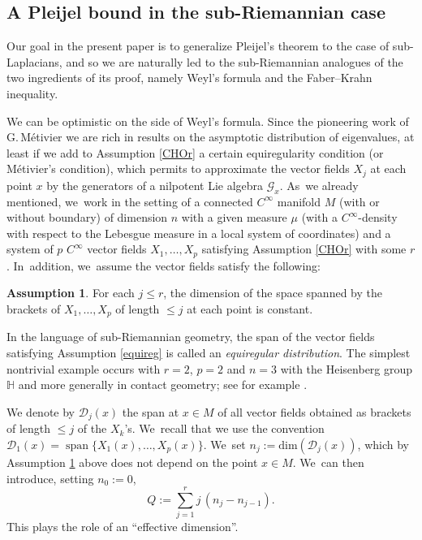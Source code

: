 \documentclass[JEP,XML,SOM,Unicode,published]{cedram}
\DeclareMathOperator{\Span}{span}
\theoremstyle{definition}
\newtheorem{assumption}[theorem]{Assumption}
\newcommand{\1}{\mathbbm{1}}
\begin{document}
\subsection{A Pleijel bound in the sub-Riemannian case}
Our goal in the present paper is to generalize Pleijel's theorem to the case of sub-Laplacians, and so we are naturally led to the sub-Riemannian analogues of the two ingredients of its proof, namely Weyl's formula and the Faber--Krahn inequality.

We can be optimistic on the side of Weyl's formula. Since the pioneering work of G.\,Métivier \cite{Me} we are rich in results on the asymptotic distribution of eigenvalues, at least if we add to Assumption \ref{CHOr} a certain equiregularity condition (or Métivier's condition), which permits to approximate the vector fields $X_j$ at each point $x$ by the generators of a nilpotent Lie algebra $\mathcal G_x$. As~we already mentioned, we~work in the setting of a connected $C^\infty$ manifold $M$ (with or without boundary) of dimension $n$ with a given measure $\mu$ (with a $C^\infty$-density with respect to the Lebesgue measure in a local system of coordinates) and a system of $p$ $C^\infty$ vector fields $X_1,\ldots,X_p$ satisfying Assumption \ref{CHOr} with some $r$. In~addition, we~assume the vector fields satisfy the following:

\begin{assumption}\label{equireg}
For each $j\leq r$, the dimension of the space spanned by the brackets of $X_1,\ldots,X_p$ of length $\leq j$ at each point is constant.
\end{assumption}

In the language of sub-Riemannian geometry, the span of the vector fields satisfying Assumption \eqref{equireg} is called an \emph{equiregular distribution}. The simplest nontrivial example occurs with $r=2$, $p=2$ and $n=3$ with the Heisenberg group $\mathbb H$ and more generally in contact geometry; see for example \cite{AgBaBo,ArRi}.

We denote by $\mathcal{D}_j(x)$ the span at $x\in M$ of all vector fields obtained as brackets of length $\leq j$ of the $X_k$'s. We~recall that we use the convention $\mathcal D_1(x)=\allowbreak\Span\{X_1(x),\ldots,X_p(x)\}$. We~set $n_j :=\text{dim}(\mathcal{D}_j(x))$, which by Assumption \ref{equireg} above does not depend on the point $x\in M$. We~can then introduce, setting $n_0:=0$,\vspace*{-5pt}\enlargethispage{.5\baselineskip}
\begin{equation}\label{eq:defQ}
Q:= \sum_{j=1}^r j \,(n_j-n_{j-1}).
\end{equation}
This plays the role of an ``effective dimension''.
\end{document}

